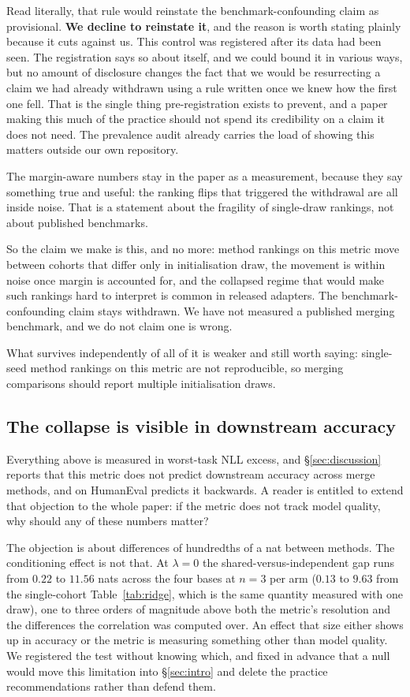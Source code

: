 Read literally, that rule would reinstate the benchmark-confounding claim
as provisional. \textbf{We decline to reinstate it}, and the reason is
worth stating plainly because it cuts against us. This control was
registered after its data had been seen. The registration says so about
itself, and we could bound it in various ways, but no amount of disclosure
changes the fact that we would be resurrecting a claim we had already
withdrawn using a rule written once we knew how the first one fell. That
is the single thing pre-registration exists to prevent, and a paper making
this much of the practice should not spend its credibility on a claim it
does not need. The prevalence audit already carries the load of showing
this matters outside our own repository.

The margin-aware numbers stay in the paper as a measurement, because they
say something true and useful: the ranking flips that triggered the
withdrawal are all inside noise. That is a statement about the fragility of
single-draw rankings, not about published benchmarks.

So the claim we make is this, and no more: method rankings on this metric
move between cohorts that differ only in initialisation draw, the movement
is within noise once margin is accounted for, and the collapsed regime that
would make such rankings hard to interpret is common in released adapters.
The benchmark-confounding claim stays withdrawn. We have not measured a
published merging benchmark, and we do not claim one is wrong.

What survives independently of all of it is weaker and still worth saying:
single-seed method rankings on this metric are not reproducible, so merging
comparisons should report multiple initialisation draws.

\subsection{The collapse is visible in downstream accuracy}
\label{subsec:downstream-cond}

Everything above is measured in worst-task NLL excess, and
\S\ref{sec:discussion} reports that this metric does not predict downstream
accuracy across merge methods, and on HumanEval predicts it backwards. A
reader is entitled to extend that objection to the whole paper: if the metric
does not track model quality, why should any of these numbers matter?

The objection is about differences of hundredths of a nat between methods. The
conditioning effect is not that. At $\lambda = 0$ the shared-versus-independent
gap runs from $0.22$ to $11.56$ nats across the four bases at $n = 3$ per
arm ($0.13$ to $9.63$ from the single-cohort Table~\ref{tab:ridge}, which is
the same quantity measured with one draw), one to three orders of magnitude above
both the metric's resolution and the differences the correlation was computed
over. An effect that size either shows up in accuracy or the metric is
measuring something other than model quality. We registered the test without
knowing which, and fixed in advance that a null would move this limitation into
\S\ref{sec:intro} and delete the practice recommendations rather than defend
them.

